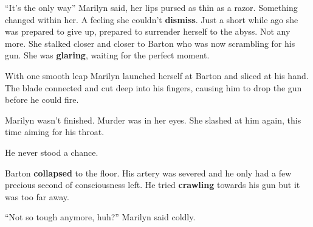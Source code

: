 ``It's  the only way'' Marilyn said, her lips pursed as thin as a  razor.
Something  changed  within her. A feeling she couldn't \textbf{dismiss}. Just  a
short while  ago  she  was prepared to give up, prepared to surrender herself to
the abyss. Not any more. She stalked closer  and  closer  to  Barton who was now
scrambling for his gun. She was \textbf{glaring}, waiting for the perfect moment.

With one smooth leap  Marilyn launched herself at Barton and sliced at his hand.
The blade connected and cut deep into his fingers,  causing  him to drop the gun
before he could fire.

Marilyn wasn't finished.  Murder was in her eyes. She slashed at him again, this
time aiming for his throat.

He never stood a chance.

Barton \textbf{collapsed} to the floor. His artery was severed and he only had a
few precious second of  consciousness  left.  He tried \textbf{crawling} towards
his gun but it was too far away.

``Not so tough anymore, huh?'' Marilyn said coldly.

